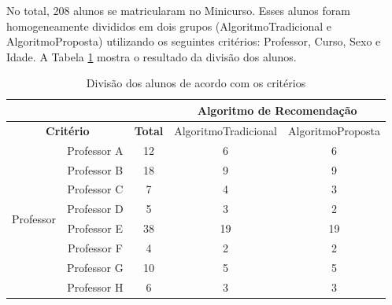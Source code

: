 No total, 208 alunos se matricularam no Minicurso. Esses alunos foram homogeneamente divididos em dois grupos
(AlgoritmoTradicional e AlgoritmoProposta) utilizando os seguintes critérios: Professor, Curso, Sexo e Idade. A
Tabela \ref{tab:divisao-alunos-experimento} mostra o resultado da divisão dos alunos.

\begin{table}[h]
\footnotesize
\caption[Divisão dos alunos de acordo com os critérios]{Divisão dos alunos de acordo com os critérios}
\label{tab:divisao-alunos-experimento}
\centering
\begin{tabular}{|c|c|c|c|c|}
  \hline
  \multicolumn{3}{|c|}{}                                                                         & \multicolumn{2}{c|}{\textbf{Algoritmo de Recomendação}} \\ \hline
  \multicolumn{2}{|c|}{\textbf{Critério}}                  & \multicolumn{1}{c|}{\textbf{Total}} & AlgoritmoTradicional & AlgoritmoProposta                \\ \hline
  \multirow{12}{*}{Professor}           & Professor A      & 12                                  & 6                    & 6                                \\
                                        & Professor B      & 18                                  & 9                    & 9                                \\
                                        & Professor C      & 7                                   & 4                    & 3                                \\
                                        & Professor D      & 5                                   & 3                    & 2                                \\
                                        & Professor E      & 38                                  & 19                   & 19                               \\
                                        & Professor F      & 4                                   & 2                    & 2                                \\
                                        & Professor G      & 10                                  & 5                    & 5                                \\
                                        & Professor H      & 6                                   & 3                    & 3                                \\

\end{tabular}
\end{table}

